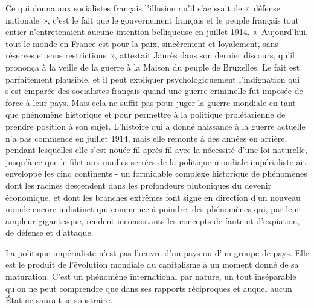 \documentclass[french,twoside]{book} %
\begin{document}
Ce qui donna aux socialistes français l’illusion qu’il s’agissait de « défense nationale », c’est le fait que le gouvernement français et le peuple français tout entier n’entretenaient aucune intention belliqueuse en juillet 1914. « Aujourd’hui, tout le monde en France est pour la paix, sincèrement et loyalement, sans réserves et sans restrictions », attestait Jaurès dans son dernier discours, qu’il prononça à la veille de la guerre à la Maison du peuple de Bruxelles. Le fait est parfaitement plausible, et il peut expliquer psychologiquement l’indignation qui s’est emparée des socialistes français quand une guerre criminelle fut imposée de force à leur pays. Mais cela ne suffit pas pour juger la guerre mondiale en tant que phénomène historique et pour permettre à la politique prolétarienne de prendre position à son sujet. L'histoire qui a donné naissance à la guerre actuelle n’a pas commencé en juillet 1914, mais elle remonte à des années en arrière, pendant lesquelles elle s’est nouée fil après fil avec la nécessité d’une loi naturelle, jusqu’à ce que le filet aux mailles serrées de la politique mondiale impérialiste ait enveloppé les cinq continents - un formidable complexe historique de phénomènes dont les racines descendent dans les profondeurs plutoniques du devenir économique, et dont les branches extrêmes font signe en direction d’un nouveau monde encore indistinct qui commence à poindre, des phénomènes qui, par leur ampleur gigantesque, rendent inconsistants les concepts de faute et d’expiation, de défense et d’attaque.\par
La politique impérialiste n’est pas l’œuvre d’un pays ou d’un groupe de pays. Elle est le produit de l’évolution mondiale du capitalisme à un moment donné de sa maturation. C'est un phénomène international par nature, un tout inséparable qu’on ne peut comprendre que dans ses rapports réciproques et auquel aucun État ne saurait se soustraire.\par
\end{document}
